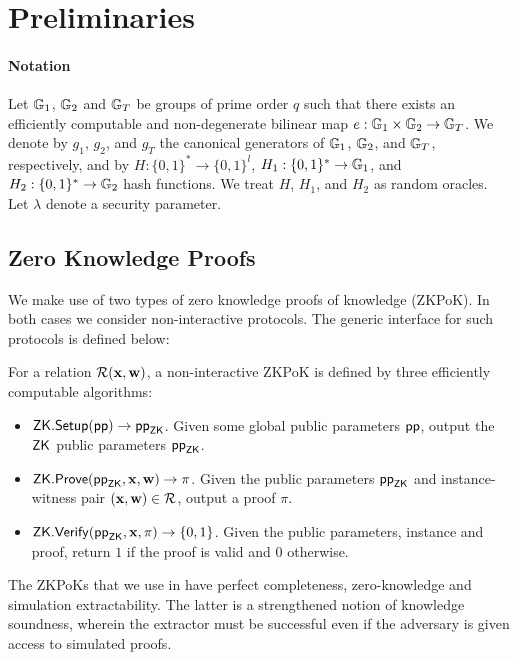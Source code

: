 \section{Preliminaries} \label{sec:background}
	\paragraph{Notation} Let $\mathbb{G}_1$, $\mathbb{G}_2$ and $\mathbb{G}_T$ be groups of prime order $q$ such that there exists an efficiently computable and non-degenerate bilinear map $e: \mathbb{G}_1 \times \mathbb{G}_2 \rightarrow \mathbb{G}_T$.
	We denote by $g_1$, $g_2$, and $g_T$ the canonical generators of $\mathbb{G}_1$, $\mathbb{G}_2$, and $\mathbb{G}_T$, respectively, and by $H: \{0,1\}^{\ast} \rightarrow \{0,1\}^l$, $H_1: \{0,1\}^{\ast} \rightarrow \mathbb{G}_1$, and $H_2: \{0,1\}^{\ast} \rightarrow \mathbb{G}_2$ hash functions.
	We treat $H$, $H_1$, and $H_2$ as random oracles. Let $\lambda$ denote a security parameter.

\subsection{Zero Knowledge Proofs}
	We make use of two types of zero knowledge proofs of knowledge (ZKPoK). 
	In both cases we consider non-interactive protocols.
	The generic interface for such protocols is defined below:
	
	\begin{definition}
		For a relation $\mathcal{R}(\mathbf{x}, \mathbf{w})$, a non-interactive ZKPoK is defined by three efficiently computable algorithms:
		\begin{itemize}
			\item $\mathsf{ZK}.\mathsf{Setup}(\mathsf{pp}) \rightarrow \mathsf{pp}_{\mathsf{ZK}}$. Given some global public parameters $\mathsf{pp}$, output the $\mathsf{ZK}$ public parameters $\mathsf{pp}_{\mathsf{ZK}}$.
			\item $\mathsf{ZK}.\mathsf{Prove}(\mathsf{pp}_{\mathsf{ZK}}, \mathbf{x}, \mathbf{w}) \rightarrow \pi$. Given the public parameters $\mathsf{pp}_{\mathsf{ZK}}$ and instance-witness pair $(\mathbf{x}, \mathbf{w}) \in \mathcal{R}$, output a proof $\pi$.
			\item $\mathsf{ZK}.\mathsf{Verify}(\mathsf{pp}_{\mathsf{ZK}}, \mathbf{x}, \pi) \rightarrow \{0, 1\}$. Given the public parameters, instance and proof, return $1$ if the proof is valid and $0$ otherwise.
		\end{itemize} 
		The ZKPoKs that we use in \sysname have perfect completeness, zero-knowledge and simulation extractability. The latter is a strengthened notion of knowledge soundness, wherein the extractor must be successful even if the adversary is given access to simulated proofs.	
	\end{definition}

